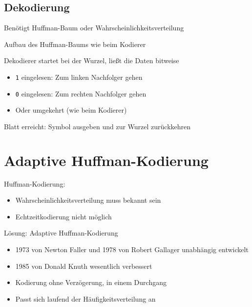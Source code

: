 \documentclass[xcolor=dvipsnames,presentation]{beamer}    %
\newenvironment{witemize}{\itemize\setlength{\itemsep}{1em}}{\enditemize}
\begin{document}
\subsection{Dekodierung}

\begin{frame}{\insertsubsection}
  \begin{witemize}
  \item Benötigt Huffman-Baum oder Wahrscheinlichkeitsverteilung
  \item Aufbau des Huffman-Baums wie beim Kodierer
  \item Dekodierer startet bei der Wurzel, ließt die Daten bitweise
    \begin{itemize}
    \item {\tt1} eingelesen: Zum linken Nachfolger gehen
    \item {\tt0} eingelesen: Zum rechten Nachfolger gehen
    \item Oder umgekehrt (wie beim Kodierer)
    \end{itemize}
  \item Blatt erreicht: Symbol ausgeben und zur Wurzel zurückkehren
  \end{witemize}
\end{frame}

\section{Adaptive Huffman-Kodierung}

\begin{frame}{\insertsection}
  \begin{witemize}
  \item Huffman-Kodierung:
    \begin{itemize}
      \item Wahrscheinlichkeitsverteilung muss bekannt sein
      \item Echtzeitkodierung nicht möglich
    \end{itemize}
  \item Lösung: Adaptive Huffman-Kodierung
    \begin{itemize}
    \item 1973 von Newton Faller und 1978 von Robert Gallager
      unabhängig entwickelt
    \item 1985 von Donald Knuth wesentlich verbessert
    \item Kodierung ohne Verzögerung, in einem Durchgang
    \item Passt sich laufend der Häufigkeitsverteilung an
    \end{itemize}
  \end{witemize}
\end{frame}
\end{document}
